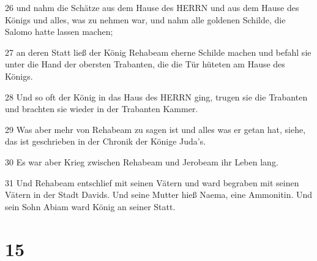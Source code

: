 \par 26 und nahm die Schätze aus dem Hause des HERRN und aus dem Hause des Königs und alles, was zu nehmen war, und nahm alle goldenen Schilde, die Salomo hatte lassen machen;
\par 27 an deren Statt ließ der König Rehabeam eherne Schilde machen und befahl sie unter die Hand der obersten Trabanten, die die Tür hüteten am Hause des Königs.
\par 28 Und so oft der König in das Haus des HERRN ging, trugen sie die Trabanten und brachten sie wieder in der Trabanten Kammer.
\par 29 Was aber mehr von Rehabeam zu sagen ist und alles was er getan hat, siehe, das ist geschrieben in der Chronik der Könige Juda's.
\par 30 Es war aber Krieg zwischen Rehabeam und Jerobeam ihr Leben lang.
\par 31 Und Rehabeam entschlief mit seinen Vätern und ward begraben mit seinen Vätern in der Stadt Davids. Und seine Mutter hieß Naema, eine Ammonitin. Und sein Sohn Abiam ward König an seiner Statt.

\chapter{15}

